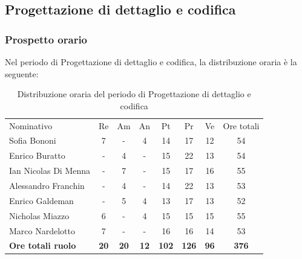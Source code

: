 \documentclass[../piano-di-progetto.tex]{subfiles}
\begin{document}
  \subsection{Progettazione di dettaglio e codifica}

  \subsubsection{Prospetto orario}
  Nel periodo di Progettazione di dettaglio e codifica, la distribuzione oraria è la seguente:
  \begin{table}[H]
    \centering
    \begin{tabular}{lccccccc}
      Nominativo                & Re          & Am          & An          & Pt           & Pr           & Ve          & Ore totali   \\
      Sofia Bononi              & 7           & -           & 4           & 14           & 17           & 12          & 54           \\
      Enrico Buratto            & -           & 4           & -           & 15           & 22           & 13          & 54           \\
      Ian Nicolas Di Menna      & -           & 7           & -           & 15           & 17           & 16          & 55           \\
      Alessandro Franchin       & -           & 4           & -           & 14           & 22           & 13          & 53           \\
      Enrico Galdeman           & -           & 5           & 4           & 13           & 17           & 13          & 52           \\
      Nicholas Miazzo           & 6           & -           & 4           & 15           & 15           & 15          & 55           \\
      Marco Nardelotto          & 7           & -           & -           & 16           & 16           & 14          & 53           \\
      \textbf{Ore totali ruolo} & \textbf{20} & \textbf{20} & \textbf{12} & \textbf{102} & \textbf{126} & \textbf{96} & \textbf{376}  
    \end{tabular}
    \caption{Distribuzione oraria del periodo di Progettazione di dettaglio e codifica}
  \end{table}
\end{document}

